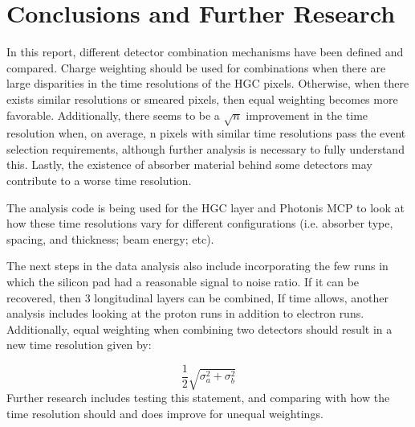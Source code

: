 \documentclass[12pt]{article}
\begin{document}
\section{Conclusions and Further Research}
In this report, different detector combination mechanisms have been defined and compared.
Charge weighting should be used for combinations when there are large disparities in the time resolutions of the HGC pixels.
Otherwise, when there exists similar resolutions or smeared pixels, then equal weighting becomes more favorable.
Additionally, there seems to be a $\sqrt{n}$ improvement in the time resolution when, on average, n pixels with similar time resolutions pass the event selection requirements, although further analysis is necessary to fully understand this.
Lastly, the existence of absorber material behind some detectors may contribute to a worse time resolution.

The analysis code is being used for the HGC layer and Photonis MCP to look at how these time resolutions vary for different configurations (i.e. absorber type, spacing, and thickness; beam energy; etc). 

The next steps in the data analysis also include incorporating the few runs in which the silicon pad had a reasonable signal to noise ratio.
If it can be recovered, then 3 longitudinal layers can be combined,
If time allows, another analysis includes looking at the proton runs in addition to electron runs.
Additionally, equal weighting when combining two detectors should result in a new time resolution given by:

\[
\frac{1}{2} \sqrt{\sigma_a^2+\sigma_b^2}
\]
Further research includes testing this statement, and comparing with how the time resolution should and does improve for unequal weightings.
\end{document}
